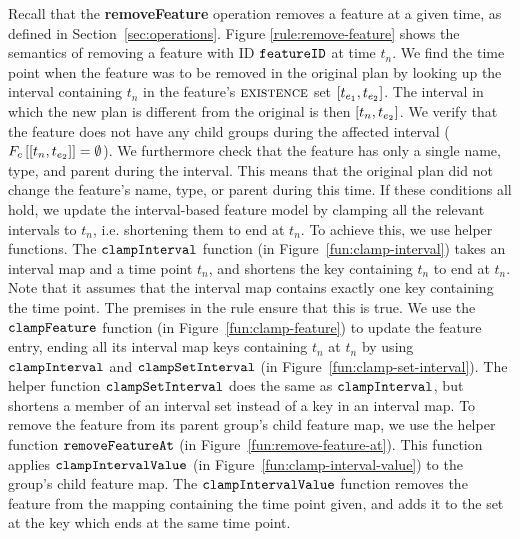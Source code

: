 Recall that the \textbf{removeFeature} operation removes a feature at a given time, as defined in Section~\ref{sec:operations}. Figure \ref{rule:remove-feature} shows the semantics of removing a feature with ID $\texttt{feature\-ID}$ at time $t_n$. We find the time point when the feature was to be removed in the original plan by looking up the interval containing $t_n$ in the feature's $\textsc{existence}$ set $\interval{t_{e_1}}{t_{e_2}}$. The interval in which the new plan is different from the original is then $\interval{t_n}{t_{e_2}}$. We verify that the feature does not have any child groups during the affected interval ($\lookup{F_c}{\interval{t_{n}}{t_{e_2}}} = \emptyset$). We furthermore check that the feature has only a single name, type, and parent during the interval. This means that the original plan did not change the feature's name, type, or parent during this time. If these conditions all hold, we update the interval-based feature model by clamping all the relevant intervals to $t_n$, i.e. shortening them to end at $t_n$. To achieve this, we use helper functions. The $\texttt{clamp\-Interval}$ function (in Figure~\ref{fun:clamp-interval}) takes an interval map and a time point $t_n$, and shortens the key containing $t_n$ to end at $t_n$. Note that it assumes that the interval map contains exactly one key containing the time point. The premises in the rule ensure that this is true. We use the $\texttt{clamp\-Feature}$ function (in Figure~\ref{fun:clamp-feature}) to update the feature entry, ending all its interval map keys containing $t_n$ at $t_n$ by using $\texttt{clamp\-Interval}$ and $\texttt{clamp\-Set\-Interval}$ (in Figure~\ref{fun:clamp-set-interval}). The helper function $\texttt{clamp\-Set\-Interval}$ does the same as $\texttt{clamp\-Interval}$, but shortens a member of an interval set instead of a key in an interval map. To remove the feature from its parent group's child feature map, we use the helper function $\texttt{remove\-Feature\-At}$ (in Figure~\ref{fun:remove-feature-at}). This function applies $\texttt{clamp\-Interval\-Value}$ (in Figure~\ref{fun:clamp-interval-value}) to the group's child feature map. The $\texttt{clamp\-Interval\-Value}$ function removes the feature from the mapping containing the time point given, and adds it to the set at the key which ends at the same time point.


